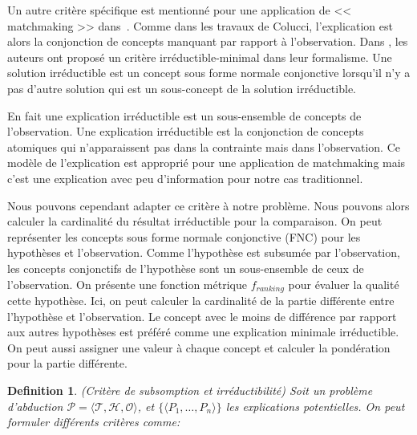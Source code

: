 \documentclass{article}
\newtheorem{mydef}{Definition}
\begin{document}
Un autre critère spécifique est mentionné pour une application de << matchmaking >> dans~\cite{DiNoia07}.
Comme dans les travaux de Colucci, l'explication est alors la conjonction de concepts manquant par rapport à l'observation. Dans \cite{DiNoia07},
les auteurs ont proposé un critère irréductible-minimal dans leur formalisme. 
Une solution irréductible est un concept sous  forme  normale conjonctive lorsqu'il n'y a pas d'autre solution qui est un sous-concept de la solution irréductible.

En fait une explication irréductible est un sous-ensemble de concepts de l'observation. Une explication irréductible est la conjonction de concepts atomiques
qui n'apparaissent pas dans la contrainte mais dans l'observation. 
Ce modèle de l'explication est approprié pour une application de matchmaking mais c'est une explication avec peu d'information pour notre cas traditionnel.

Nous pouvons cependant adapter ce critère à notre problème. Nous pouvons alors calculer la cardinalité du résultat irréductible pour la comparaison.
On peut représenter les concepts sous forme normale conjonctive (FNC) pour les hypothèses et l'observation. Comme l'hypothèse est subsumée par l'observation, les concepts conjonctifs de l'hypothèse sont un sous-ensemble
de ceux de l'observation. On présente une fonction métrique $f_{ranking}$ pour évaluer la qualité cette hypothèse. Ici, on peut calculer la cardinalité de la partie différente
entre l'hypothèse et l'observation. Le concept avec le moins de différence par rapport aux autres hypothèses est préféré comme une explication minimale irréductible. On peut aussi
assigner une valeur à chaque concept et calculer la pondération pour  la partie différente.


\begin{mydef}{(Critère de subsomption et irréductibilité)}
Soit un problème d'abduction $\mathcal{P}=\langle \mathcal{T},\mathcal{H}, \mathcal{O}\rangle$, et $\{\langle P_{1},\dots,P_{n}\rangle\}$ les explications potentielles. 
On peut formuler différents critères comme:

\end{mydef}
\end{document}
